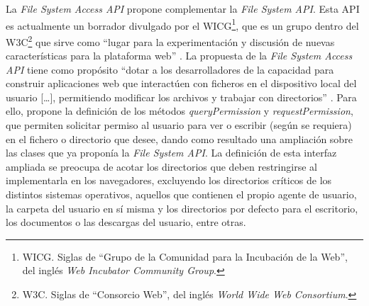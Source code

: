 La \textit{File System Access API} propone complementar la \textit{File System API}. Esta API es actualmente un borrador divulgado por el WICG\footnote{WICG. Siglas de ``Grupo de la Comunidad para la Incubación de la Web'', del inglés \textit{Web Incubator Community Group}.}, que es un grupo dentro del W3C\footnote{W3C. Siglas de ``Consorcio Web'', del inglés \textit{World Wide Web Consortium}.} que sirve como ``lugar para la experimentación y discusión de nuevas características para la plataforma web'' \cite{WICG}. La propuesta de la \textit{File System Access API} tiene como propósito ``dotar a los desarrolladores de la capacidad para construir aplicaciones web que interactúen con ficheros en el dispositivo local del usuario [\dots], permitiendo modificar los archivos y trabajar con directorios'' \cite{FileSystemAccessAPI}. Para ello, propone la definición de los métodos \textit{queryPermission} y \textit{requestPermission}, que permiten solicitar permiso al usuario para ver o escribir (según se requiera) en el fichero o directorio que desee, dando como resultado una ampliación sobre las clases que ya proponía la \textit{File System API}. La definición de esta interfaz ampliada se preocupa de acotar los directorios que deben restringirse al implementarla en los navegadores, excluyendo los directorios críticos de los distintos sistemas operativos, aquellos que contienen el propio agente de usuario, la carpeta del usuario en sí misma y los directorios por defecto para el escritorio, los documentos o las descargas del usuario, entre otras.

